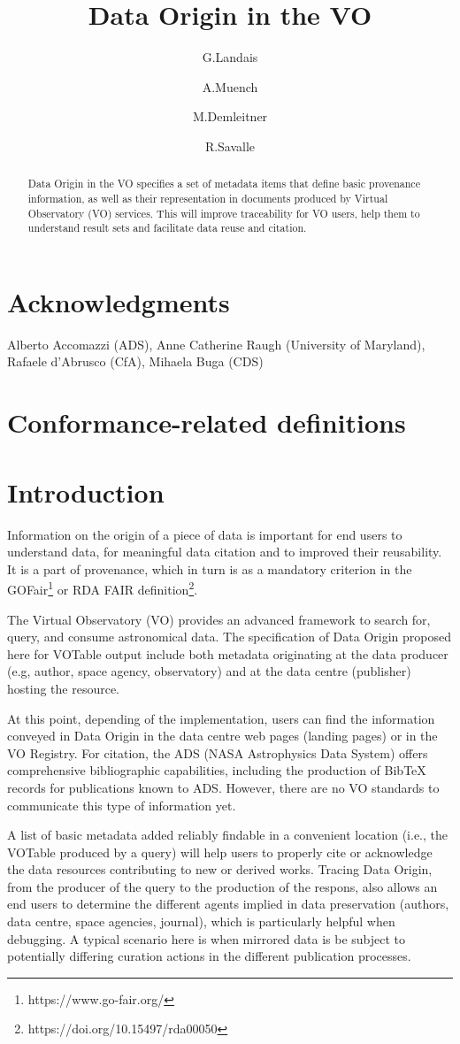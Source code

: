 \documentclass[11pt,a4paper]{ivoa}
\title{Data Origin in the VO}
\author{G.Landais}
\author{A.Muench}
\author{M.Demleitner}
\author{R.Savalle}
\begin{document}
\begin{abstract}
Data Origin in the VO specifies a set of metadata items that define basic
provenance information, as well as their representation in documents produced
by Virtual Observatory (VO) services.  This will improve traceability for VO
users, help them to understand result sets and facilitate data reuse and citation.

\end{abstract}


\section*{Acknowledgments}
Alberto Accomazzi (ADS), Anne Catherine Raugh (University of Maryland), Rafaele d'Abrusco (CfA), Mihaela Buga (CDS)

\section*{Conformance-related definitions}


\section{Introduction}

Information on the origin of a piece of data is important for end users to understand data, for meaningful data citation and to improved their reusability.  It is a part of provenance, which in turn is as a mandatory criterion in the GOFair\footnote{https://www.go-fair.org/} or RDA FAIR definition\footnote{https://doi.org/10.15497/rda00050}.

The Virtual Observatory (VO) provides an advanced framework to search for, query, and consume astronomical data.  The specification of Data Origin proposed here for VOTable output include both metadata originating at the data producer (e.g, author, space agency, observatory) and at the data centre (publisher) hosting the resource.

At this point, depending of the implementation, users can find the information conveyed in Data Origin in the data centre web pages (landing pages) or in the VO Registry.  For citation, the ADS (NASA Astrophysics Data System) offers comprehensive bibliographic capabilities, including the production of BibTeX records for publications known to ADS.  However, there are no VO standards to communicate this type of information yet.

A list of basic metadata added reliably findable in a convenient location (i.e.,
the VOTable produced by a query) will help users to properly cite or
acknowledge the data resources contributing to new or derived works.
Tracing Data Origin, from the producer of the query to the production of the respons, also allows an end users to determine the different agents implied in data preservation (authors, data centre, space agencies, journal), which is particularly helpful when debugging.  A typical scenario here is when mirrored data is be subject to potentially differing curation actions in the different publication processes.
\end{document}
